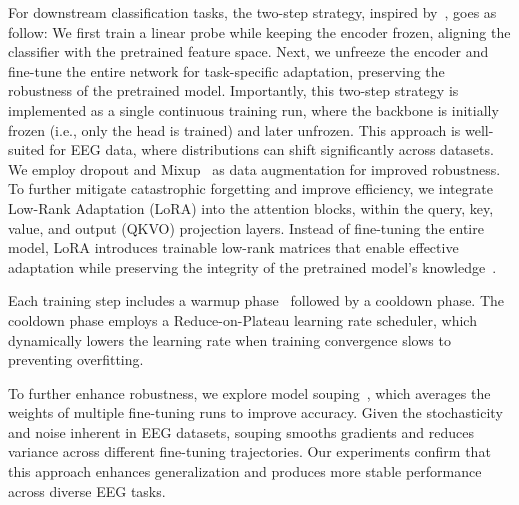 \documentclass{article}
\begin{document}
For downstream classification tasks, the two-step strategy, inspired by~\citet{kumar2022finetuning}, goes as follow: We first train a linear probe while keeping the encoder frozen, aligning the classifier with the pretrained feature space. Next, we unfreeze the encoder and fine-tune the entire network for task-specific adaptation, preserving the robustness of the pretrained model. Importantly, this two-step strategy is implemented as a single continuous training run,  where the backbone is initially frozen (i.e., only the head is trained) and later unfrozen. This approach is well-suited for EEG data, where distributions can shift significantly across datasets. We employ dropout and Mixup~\citep{zhang2018mixup} as data augmentation for improved robustness.
To further mitigate catastrophic forgetting and improve efficiency, we integrate Low-Rank Adaptation (LoRA) into the attention blocks, within the query, key, value, and output (QKVO) projection layers. Instead of fine-tuning the entire model, LoRA introduces trainable low-rank matrices that enable effective adaptation while preserving the integrity of the pretrained model’s knowledge~\citep{hu2022lora}. 

Each training step includes a warmup phase~\citep{kalra2024warmup} followed by a cooldown phase. The cooldown phase employs a Reduce-on-Plateau learning rate scheduler, which dynamically lowers the learning rate when training convergence slows to preventing overfitting.

To further enhance robustness, we explore model souping~\citep{wortsman2022soup}, which averages the weights of multiple fine-tuning runs to improve accuracy. Given the stochasticity and noise inherent in EEG datasets, souping smooths gradients and reduces variance across different fine-tuning trajectories. Our experiments confirm that this approach enhances generalization and produces more stable performance across diverse EEG tasks.
\end{document}
